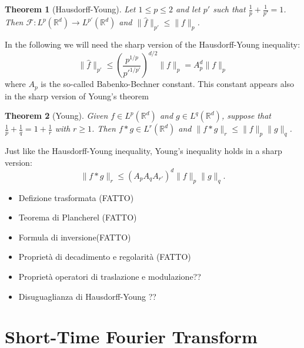 \documentclass[corpo=11pt, stile=classica, tipotesi=custom,
greek, evenboxes, english]{toptesi}
\numberwithin{equation}{chapter}
\newtheorem{teo}{Theorem}[chapter] %
\theoremstyle{remark}
\newcommand{\R}{\mathbb{R}} %
\newcommand{\F}{\mathscr{F}} %
\begin{document}
{\color{blue}\begin{teo}[Hausdorff-Young]
	Let $1 \leq p \leq 2$ and let $p'$ such that $\frac{1}{p} + \frac{1}{p'} = 1$. Then $\F : L^p(\R^d) \rightarrow L^{p'}(\R^d)$ and $\| \hat{f }\|_{p'} \leq \| f \|_p$.
\end{teo}}
In the following we will need the sharp version of the Hausdorff-Young inequality: 
\begin{equation}\label{Hausdorff-Yound inequality}
	\| \hat{f} \|_{p'} \leq \left(\dfrac{p^{1/p}}{p'^{1/p'}}\right)^{d/2} \|f\|_p = A_p^d \|f\|_p
\end{equation}
where $A_p$ is the so-called Babenko-Bechner constant. This constant appears also in the sharp version of Young's theorem
\begin{teo}[Young]\label{Young theorem}
	Given $f \in L^p(\R^d)$ and $g \in L^q(\R^d)$, suppose that $\frac{1}{p}+\frac{1}{q}=1+\frac{1}{r}$ with $r \geq 1$. Then $f * g \in L^r(\R^d)$ and $\|f * g\|_r \leq \|f\|_p \|g\|_q$.
\end{teo}
Just like the Hausdorff-Young inequality, Young's inequality holds in a sharp version:
\begin{equation}\label{Young inequality sharp}
	\|f * g\|_r \leq (A_p A_q A_{r'})^d \|f\|_p \|g\|_q.
\end{equation}


	\begin{itemize}
		\item Defizione trasformata (FATTO)
		\item Teorema di Plancherel (FATTO)
		\item Formula di inversione(FATTO)
		\item Proprietà di decadimento e regolarità (FATTO)
		\item Proprietà operatori di traslazione e modulazione??
		\item Disuguaglianza di Hausdorff-Young ??
	\end{itemize}


\chapter{Short-Time Fourier Transform}\label{chapter STFT}
\end{document}
